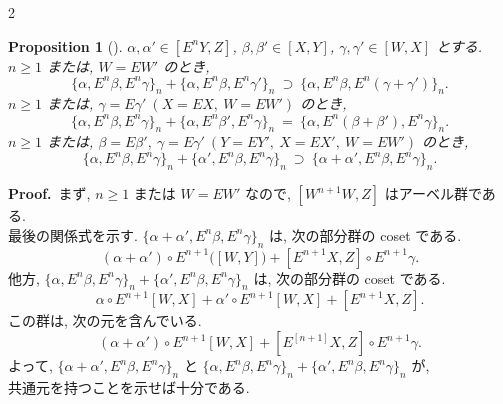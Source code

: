 \documentclass[10pt, leqno]{ltjsarticle}
\newcommand{\Ex}{E}        %
\numberwithin{equation}{section}
\theoremstyle{plain}
\newtheorem{proposition}[theorem]{Proposition}
\theoremstyle{definition}
\theoremstyle{remark}
\begin{document}
\begin{paracol}{2}

\begin{proposition}[]\label{prop:1-6}
$\alpha,\alpha'\in[\Ex^n Y, Z]$, $\beta,\beta'\in[X, Y]$, 
$\gamma,\gamma'\in[W, X]$ とする. \\
$n\ge 1$ \emph{または,} $W=\Ex W'$ のとき,
\[
\{\alpha,\Ex^n\beta,\Ex^n\gamma\}_n
+
\{\alpha,\Ex^n\beta,\Ex^n\gamma'\}_n
\ \supset\
\{\alpha,\Ex^n\beta,\Ex^n(\gamma+\gamma')\}_n.
\]
$n\ge 1$ \emph{または,} $\gamma=\Ex\gamma' \ (X=\Ex X,\ W=\Ex W')$ のとき,
\[
\{\alpha,\Ex^n\beta,\Ex^n\gamma\}_n
+
\{\alpha,\Ex^n\beta',\Ex^n\gamma\}_n
\ =\
\{\alpha,\Ex^n(\beta+\beta'),\Ex^n\gamma\}_n.
\]
$n\ge 1$ \emph{または,} 
$\beta=\Ex\beta',\ \gamma=\Ex\gamma' \ (Y=\Ex Y',\ X=\Ex X',\ W=\Ex W')$ のとき,
\[
\{\alpha,\Ex^n\beta,\Ex^n\gamma\}_n
+
\{\alpha',\Ex^n\beta,\Ex^n\gamma\}_n
\ \supset\
\{\alpha+\alpha',\Ex^n\beta,\Ex^n\gamma\}_n.
\]
\end{proposition}

\noindent
\textbf{Proof.}\
まず, 
\(n\ge1\) または \(W=EW'\) なので, 
\([W^{n+1}W,Z]\) はアーベル群である.\\
最後の関係式を示す. 
\(
\{\alpha+\alpha',\Ex^n\beta,\Ex^n\gamma\}_n
\)
は, 次の部分群の coset である. 
\[
(\alpha+\alpha')\circ \Ex^{n+1}\!\bigl([W, Y]\bigr) 
+ [\Ex^{n+1}X, Z]\circ \Ex^{n+1}\gamma.
\]
他方, 
\(
\{\alpha,\Ex^n\beta,\Ex^n\gamma\}_n + \{\alpha',\Ex^n\beta,\Ex^n\gamma\}_n
\)
は, 次の部分群の coset である.
\[
\alpha\circ E^{n+1}[W,X]
+ \alpha'\circ E^{n+1}[W,X]
+ [E^{n+1}X,Z].
\]
この群は, 次の元を含んでいる.
\[
(\alpha + \alpha') \circ E^{n+1}[W,X]
+ [E^[n+1]X,Z] \circ E^{n+1}\gamma.
\]
よって,
\(
\{\alpha+\alpha',\Ex^n\beta,\Ex^n\gamma\}_n
\)
と
\(
\{\alpha,\Ex^n\beta,\Ex^n\gamma\}_n + \{\alpha',\Ex^n\beta,\Ex^n\gamma\}_n
\)
が, \\
共通元を持つことを示せば十分である.


\end{paracol}
\end{document}
